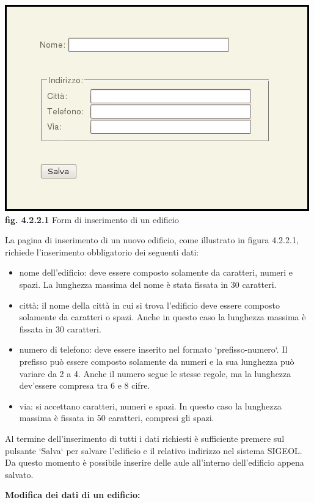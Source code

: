 \documentclass[11pt,a4paper]{article}
\begin{document}
\begin{center}
	\includegraphics[scale=0.5]{images/nuovo_edificio.jpg}\\
	\textbf{fig. 4.2.2.1} Form di inserimento di un edificio\\
\end{center}

La pagina di inserimento di un nuovo edificio, come illustrato in figura 4.2.2.1, richiede l'inserimento obbligatorio dei seguenti dati:
\begin{itemize}
 \item nome dell'edificio: deve essere composto solamente da caratteri, numeri e spazi. La lunghezza massima del nome è stata fissata in 30 caratteri.
 \item città: il nome della città in cui si trova l'edificio deve essere composto solamente da caratteri o spazi. Anche in questo caso la lunghezza massima è fissata in 30 caratteri.
 \item numero di telefono: deve essere inserito nel formato `prefisso-numero`. Il prefisso può essere composto solamente da numeri e la sua lunghezza può variare da 2 a 4. Anche il numero segue le stesse regole, ma la lunghezza dev'essere compresa tra 6 e 8 cifre.
 \item via: si accettano caratteri, numeri e spazi. In questo caso la lunghezza massima è fissata in 50 caratteri, compresi gli spazi.
\end{itemize}
Al termine dell'inserimento di tutti i dati richiesti è sufficiente premere sul pulsante `Salva` per salvare l'edificio e il relativo indirizzo nel sistema SIGEOL.
Da questo momento è possibile inserire delle aule all'interno dell'edificio appena salvato.
\newline \newline
\begin{large}\textbf{Modifica dei dati di un edificio:}\end{large}
\end{document}
